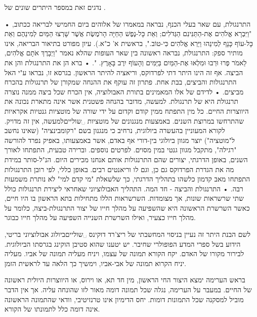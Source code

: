 נדגים זאת במספר היתרים שונים של .
\begin{enumerate}
•  התרנגולת, עם שאר בעלי הכנף, נבראה במאמרו של אלוהים ביום החמישי לבריאה ככתוב, "וַיִּבְרָא אֱלֹהִים אֶת-הַתַּנִּינִם הַגְּדֹלִים; וְאֵת כָּל-נֶפֶשׁ הַחַיָּה הָרֹמֶשֶׂת אֲשֶׁר שָׁרְצוּ הַמַּיִם לְמִינֵהֶם וְאֵת כָּל-עוֹף כָּנָף לְמִינֵהוּ וַיַּרְא אֱלֹהִים כִּי-טוֹב.", בראשית א' כ"א.). עיון מפורט בתיאור הבריאה, אינו מותיר ספק: התרנגולת, נבראה ראשונה בין שאר העופות שהלא נאמר "וַיְבָרֶךְ אֹתָם אֱלֹהִים, לֵאמֹר פְּרוּ וּרְבוּ וּמִלְאוּ אֶת-הַמַּיִם בַּיַּמִּים וְהָעוֹף יִרֶב בָּאָרֶץ. ".
•   ברא הן את התרנגולת והן את הביצה. אף זה הינו היתר דתי לפרדוקס, וריאציה להיתר הראשון. בגרסא זו, נבראו ע"י האל התרנגולות והביצים, בבת אחת. פתרון זה עוקף את ההנחה שמקורן של תרנגולות בהכרח מביצים.
•  לדידם של אלו המאמינים בתורת האבולוציה, אין הכרח שכל ביצה ממנה נוצרה תרנגולת היא של תרנגולת. למעשה, מדובר בהנחה פשטנית אשר אינה מתארת נכונה את היווצרות החיים. כל מין התפתח ממין קודם וקדום על ידי שורה של מוטציות גנטיות אקראיות שהתרחשו במרוצת השנים. באמצעות מנגנונים של מוטציות ␣שוליים{למעשה, אין זה מדויק. לקורא המעוניין בהעשרה ביולוגית, נרחיב כי מנגנון בשם "רקומבינציה" (שאינו נחשב ל"מוטציה") יוצר מגוון ביולוגי בין-דורי אף באדם, אשר באמצעותו, באפיק נפרד להורשה "רגילה", מתקבל מגוון גנטי במין מסוים. לפרטים נוספים.} וברירה טבעית, התפתחו לאורך השנים, באופן הדרגתי, יצורים שהם התרנגולות אותם אנחנו מכירים היום. הנ"ל-סותר במידת מה את הגדרת הפרדוקס גם כן, וגם לו וריאנטים רבים. באופן כללי, לפי רובן התרנגולות התפתחו מאב קדמון כלשהו בתהליך הדרגתי, כך שלשאלת "מי קדם למי" לא נותרת משמעות רבה.
•  התרנגולת והביצה - חד המה. התהליך האבולוציוני שאחראי ליצירת תרנגולות כולל שתי שרשראות שונות, אך מצומדות. השרשראות הללו מתחילות בתא הראשון בו היו חיים, כאשר השרשרת הראשונה היא שהשפיעה על מהלך חייו של יצור התרנגולת-ביצה, כלומר על מהלך חייו כצעיר, ואילו השרשרת השנייה השפיעה על מהלך חייו כבוגר.

לשם הבנת היתר זה נעיין בניסוי המחשבתי של ריצ'רד דוקינס ␣שוליים{ביולוג
אבולוציוני בריטי, הידוע בשל ספרי המדע הפופולרי שחיבר. יש יטענו שהוא סטיבן
הוקינג בגרסתו הביולוגית.} לבירור מקורו של האדם. יקח הקורא תמונה של עצמו, ויניח
מעליה תמונה של אביו. מעליה יניח הקרוא תמונה של אבי-אביו, וימשיך כך הלאה עד
לראשית הזמן.

בראש הערימה ימצא היצור החי הראשון, מין חד תא, או וירוס, או היווצרות היולית
ראשונה של החיים. במעבר על הערימה, נגלה שכל תמונה דומה מאור לזו שהונחה עליה. אך
אין הדבר מוביל למסקנה שכל התמונות דומות. יחס הדימיון אינו טרנזיטיבי, וודאי
שהתמונה הראשונה אינה דומה כלל לתמונתו של הקורא.


\end{enumerate}
